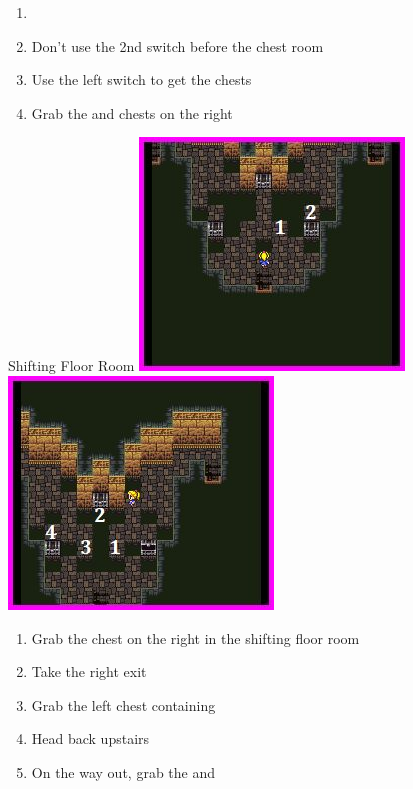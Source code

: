 \begin{paracol}{2}
\switchcolumnTwice[*]
\begin{enumerate}[resume]
    \item {}
    \item Don't use the 2nd switch before the chest room
    \item Use the left switch to get the chests
    \item Grab the  and  chests on the right
\end{enumerate}

\switchcolumn
\begin{misc}{Shifting Floor Room}
    \includegraphics[scale=0.449]{../Graphics/Steps/177. Pyramid 2.jpeg}
    \includegraphics[scale=0.449]{../Graphics/Steps/178. Pyramid 3.jpeg}
\end{misc}

\switchcolumn
\resume
\begin{enumerate}[resume]
    \item Grab the  chest on the right in the shifting floor room
    \item Take the right exit
    \item Grab the left chest containing 
    \item Head back upstairs
    \item On the way out, grab the  and 
\end{enumerate}

\end{paracol}